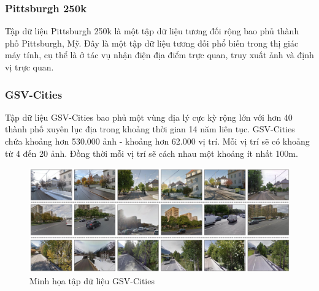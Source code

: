 \subsubsection*{Pittsburgh 250k \cite{6618963}}
Tập dữ liệu Pittsburgh 250k \cite{6618963} là một tập dữ liệu tương đối rộng bao phủ thành phố Pittsburgh, Mỹ. Đây là một tập dữ liệu tương đối phổ biến trong thị giác máy tính, cụ thể là ở tác vụ nhận điện địa điểm trực quan, truy xuất ảnh và định vị trực quan.

\subsubsection*{GSV-Cities \cite{Ali_bey_2022}}
Tập dữ liệu GSV-Cities \cite{Ali_bey_2022} bao phủ một vùng địa lý cực kỳ rộng lớn với hơn 40 thành phố xuyên lục địa trong khoảng thời gian 14 năm liên tục. GSV-Cities chứa khoảng hơn 530.000 ảnh - khoảng hơn 62.000 vị trí. Mỗi vị trí sẽ có khoảng từ 4 đến 20 ảnh. Đồng thời mỗi vị trí sẽ cách nhau một khoảng ít nhất 100m.
\begin{figure}[H]
	\centering
	\includegraphics[width=\textwidth]{pics/Chapter2/gsv.png}
	\caption{Minh họa tập dữ liệu GSV-Cities \cite{Ali_bey_2022}}
\end{figure}


